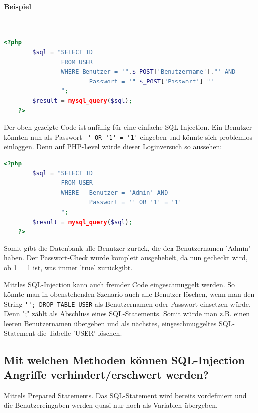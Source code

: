 \documentclass[a4paper, 11pt, nofootinbib]{article}
\begin{document}
\paragraph{Beispiel}\mbox{}\\


\begin{lstlisting}[language=php, captionpos=b, caption={PHP Code mit unvalidiertem SQL-Code}]
	<?php
		$sql = "SELECT ID
				FROM USER
				WHERE Benutzer = '".$_POST['Benutzername']."' AND 
						Passwort = '".$_POST['Passwort']."'
				";
		$result = mysql_query($sql);
	?>
\end{lstlisting}

Der oben gezeigte Code ist anfällig für eine einfache SQL-Injection. Ein Benutzer könnten nun als Passwort \verb|'' OR '1' = '1'| eingeben und könnte sich problemlos einloggen. Denn auf PHP-Level würde dieser Loginversuch so aussehen:

\begin{lstlisting}[language=php]
	<?php
		$sql = "SELECT ID
				FROM USER
				WHERE 	Benutzer = 'Admin' AND 
						Passwort = '' OR '1' = '1'
				";
		$result = mysql_query($sql);
	?>
\end{lstlisting}

Somit gibt die Datenbank alle Benutzer zurück, die den Benutzernamen 'Admin' haben. Der Passwort-Check wurde komplett ausgehebelt, da nun gecheckt wird, ob 1 = 1 ist, was immer 'true' zurückgibt.

\vspace{10px}

\noindent Mittles SQL-Injection kann auch fremder Code eingeschmuggelt werden. So könnte man in obenstehenden Szenario auch alle Benutzer löschen, wenn man den String \verb|''; DROP TABLE USER| als Benutzernamen oder Passwort einsetzen würde. Denn ";" zählt als Abschluss eines SQL-Statements. Somit würde man z.B. einen leeren Benutzernamen übergeben und als nächstes, eingeschmuggeltes SQL-Statement die Tabelle 'USER' löschen.

\newpage

\subsection{Mit welchen Methoden können SQL-Injection Angriffe verhindert/erschwert werden?}
Mittels Prepared Statements. Das SQL-Statement wird bereits vordefiniert und die Benutzereingaben werden quasi nur noch als Variablen übergeben.
\end{document}

